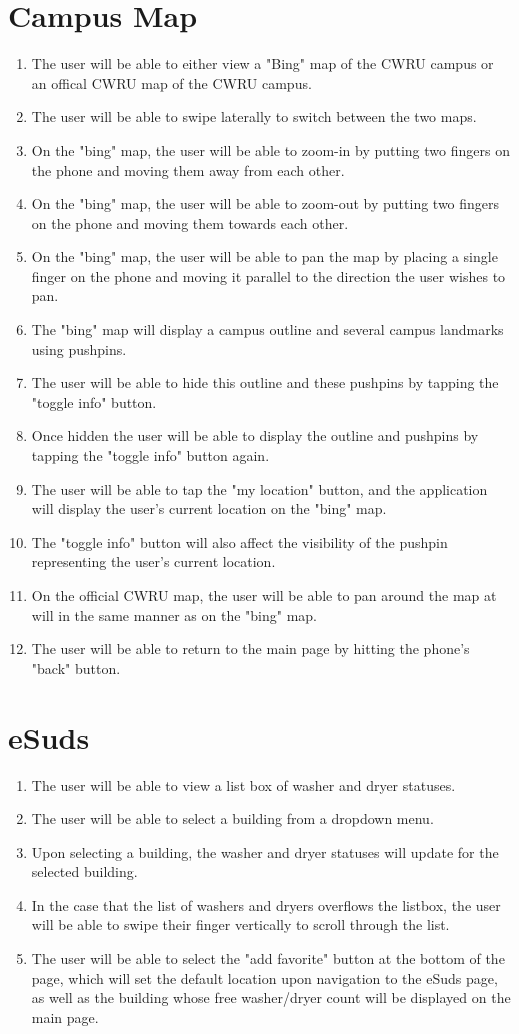 \documentclass[pdftex,12pt,letter]{article}
\begin{document}
\section{Campus Map}
\begin{enumerate}[1.]
\item The user will be able to either view a "Bing" map of the CWRU campus or an offical CWRU map of the CWRU campus.
\item The user will be able to swipe laterally to switch between the two maps.
\item On the "bing" map, the user will be able to zoom-in by putting two fingers on the phone and moving them away from each other.
\item On the "bing" map, the user will be able to zoom-out by putting two fingers on the phone and moving them towards each other.
\item On the "bing" map, the user will be able to pan the map by placing a single finger on the phone and moving it parallel to the direction the user wishes to pan.
\item The "bing" map will display a campus outline and several campus landmarks using pushpins.
\item The user will be able to hide this outline and these pushpins by tapping the "toggle info" button.
\item Once hidden the user will be able to display the outline and pushpins by tapping the "toggle info" button again.
\item The user will be able to tap the "my location" button, and the application will display the user's current location on the "bing" map.
\item The "toggle info" button will also affect the visibility of the pushpin representing the user's current location.
\item On the official CWRU map, the user will be able to pan around the map at will in the same manner as on the "bing" map.
\item The user will be able to return to the main page by hitting the phone's "back" button.
\end{enumerate}
\section{eSuds}
\begin{enumerate}[1.]
\item The user will be able to view a list box of washer and dryer statuses.
\item The user will be able to select a building from a dropdown menu.
\item Upon selecting a building, the washer and dryer statuses will update for the selected building.
\item In the case that the list of washers and dryers overflows the listbox, the user will be able to swipe their finger vertically to scroll through the list.
\item The user will be able to select the "add favorite" button at the bottom of the page, which will set the default location upon navigation to the eSuds page, as well as the building whose free washer/dryer count will be displayed on the main page.
\end{enumerate}
\end{document}
